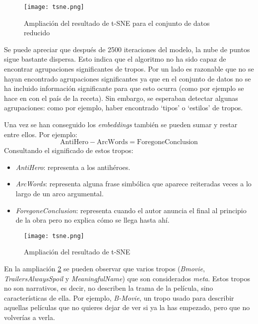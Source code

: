 \begin{figure}\label{tsne}
  \texttt{[image: tsne.png]}
  \centering
  \caption{Ampliación del resultado de t-SNE para el conjunto de datos reducido}
\end{figure}

Se puede apreciar que después de 2500 iteraciones del modelo, la nube de puntos sigue bastante dispersa. Esto indica que el algoritmo no ha sido capaz de encontrar
agrupaciones significantes de tropos. Por un lado es razonable que no se hayan encontrado agrupaciones significantes ya que en el conjunto de datos no se ha incluido
información significante para que esto ocurra (como por ejemplo se hace en \cite{kazama2018neural} con el país de la receta). Sin embargo, se esperaban detectar algunas
agrupaciones: como por ejemplo, haber encontrado `tipos' o `estilos' de tropos.

Una vez se han conseguido los \textit{embeddings} también se pueden sumar y restar entre ellos. Por ejemplo:
\begin{equation}
  \text{AntiHero} - \text{ArcWords} = \text{ForegoneConclusion}
\end{equation}
Consultando el significado de estos tropos:
\begin{itemize}
  \item \textit{AntiHero}: representa a los antihéroes.
  \item \textit{ArcWords}: representa alguna frase simbólica que aparece reiteradas veces a lo largo de un arco argumental.
  \item \textit{ForegoneConclusion}: representa cuando el autor anuncia el final al principio de la obra pero no explica cómo se llega hasta ahí.
\end{itemize}

\begin{figure}\label{ampliacion_meta}
  \texttt{[image: tsne.png]}
  \centering
  \caption{Ampliación del resultado de t-SNE}
\end{figure}

En la ampliación \ref{ampliacion_meta} se pueden observar que varios tropos (\textit{Bmovie}, \textit{TrailersAlwaysSpoil} y \textit{MeaningfulName}) que son considerados \textit{meta}. Estos tropos no son narrativos,
es decir, no describen la trama de la película, sino características de ella. Por ejemplo, \textit{B-Movie}, un tropo usado para describir aquellas películas que no quieres dejar de ver
si ya la has empezado, pero que no volverías a verla.

